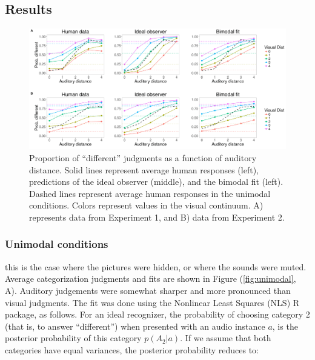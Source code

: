 \documentclass[10pt,letterpaper]{article}
\begin{document}
\subsection{Results}
%

\begin{figure}[t]
\centering
\includegraphics[width=1\textwidth]{pictures/bimodal.pdf}
\caption{Proportion of ``different'' judgments as a function of auditory distance. Solid lines represent average human responses (left), predictions of the ideal observer (middle), and the bimodal fit (left). Dashed lines represent average human responses in the unimodal conditions. Colors represent values in the visual continuum. A) represents data from Experiment 1, and B) data from Experiment 2.}
\label{fig:Exp}
\end{figure}

\subsubsection{Unimodal conditions} this is the case where the pictures were hidden, or where the sounds were muted.
Average categorization judgments and fits are shown in Figure (\ref{fig:unimodal}, A). Auditory judgements were somewhat sharper and more pronounced than visual judgments. The fit was done using the Nonlinear Least Squares (NLS) R package, as follows. For an ideal recognizer, the probability of choosing category 2 (that is, to answer ``different'') when presented with an audio instance $a$, is the posterior probability of this category $p(A_2|a)$. If we assume that both categories have equal variances, the posterior probability reduces to:
\end{document}
